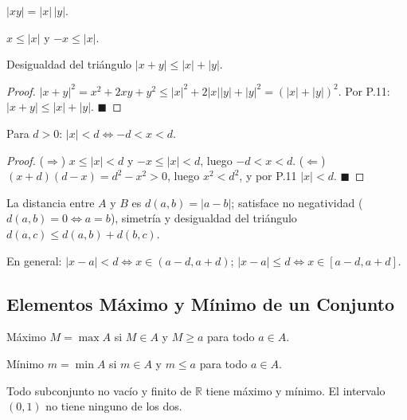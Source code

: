 \documentclass[12pt]{article}
\begin{document}
\begin{proposicion}[4]{}
$|xy| = |x|\,|y|$.
\end{proposicion}

\begin{proposicion}[5]{}
$x \leq |x|$ y $-x \leq |x|$.
\end{proposicion}

\begin{proposicion}[6]{Desigualdad del triángulo}
$|x + y| \leq |x| + |y|$.
\end{proposicion}

\begin{proof}
$|x+y|^2 = x^2+2xy+y^2 \leq |x|^2+2|x||y|+|y|^2 = (|x|+|y|)^2$. Por P.11: $|x+y| \leq |x|+|y|$.
$\blacksquare$
\end{proof}

\begin{proposicion}[7]{}
Para $d > 0$: $|x| < d \iff -d < x < d$.
\end{proposicion}

\begin{proof}
($\Rightarrow$) $x \leq |x| < d$ y $-x \leq |x| < d$, luego $-d < x < d$.
($\Leftarrow$) $(x+d)(d-x) = d^2-x^2 > 0$, luego $x^2 < d^2$, y por P.11 $|x| < d$.
$\blacksquare$
\end{proof}

\begin{observacion}[]{}
La distancia entre $A$ y $B$ es $d(a,b) = |a-b|$; satisface no negatividad ($d(a,b)=0 \iff a=b$), simetría y desigualdad del triángulo $d(a,c) \leq d(a,b)+d(b,c)$.
\end{observacion}

En general: $|x-a| < d \iff x \in (a-d, a+d)$; \quad $|x-a| \leq d \iff x \in [a-d, a+d]$.

\subsection{Elementos Máximo y Mínimo de un Conjunto}

\begin{definicion}[]{Máximo}
$M = \max A$ si $M \in A$ y $M \geq a$ para todo $a \in A$.
\end{definicion}

\begin{definicion}[]{Mínimo}
$m = \min A$ si $m \in A$ y $m \leq a$ para todo $a \in A$.
\end{definicion}

Todo subconjunto no vacío y finito de $\mathbb{R}$ tiene máximo y mínimo. El intervalo $(0,1)$ no tiene ninguno de los dos.
\end{document}
